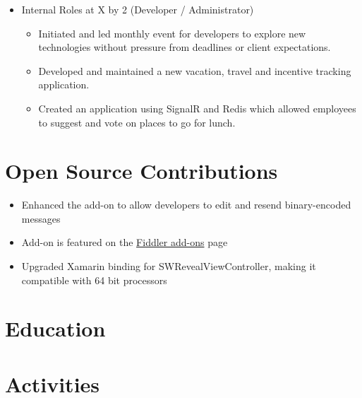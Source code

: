 \documentclass[12pt,letterpaper,sans]{moderncv}
\begin{document}
\begin{itemize}[leftmargin=1.24in]
        \item Internal Roles at X by 2 (Developer / Administrator)
            \begin{itemize}
            	\item Initiated and led monthly event for developers to explore new technologies without pressure from deadlines or client expectations.
                \item Developed and maintained a new vacation, travel and incentive tracking application.
                \item Created an application using SignalR and Redis which allowed employees to suggest and vote on places to go for lunch.
            \end{itemize}
    \end{itemize}
\newpage
\section{Open Source Contributions}
	\begin{itemize}[leftmargin=1.24in]
		\item Enhanced the add-on to allow developers to edit and resend binary-encoded messages
		\item Add-on is featured on the \href{www.telerik.com/fiddler/add-ons}{Fiddler add-ons} page
	\end{itemize}
	\begin{itemize}[leftmargin=1.24in]
		\item Upgraded Xamarin binding for SWRevealViewController, making it compatible with 64 bit processors
	\end{itemize}


\section{Education}

\section{Activities}
\end{document}
